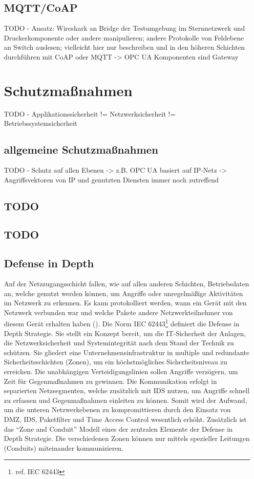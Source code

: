 \subsection{\ac{MQTT}/\ac{CoAP}}
TODO - Ansatz: Wireshark an Bridge der Testumgebung im Sternnetzwerk und Druckerkomponente oder andere manipulieren; andere Protokolle von Feldebene an Switch auslesen; vielleicht hier nur beschreiben und in den höheren Schichten durchführen mit CoAP oder MQTT -> OPC UA Komponenten sind Gateway

\section{Schutzmaßnahmen}
TODO - Applikationssicherheit != Netzwerksicherheit != Betriebssystemsicherheit

\subsection{allgemeine Schutzmaßnahmen}
TODO - Schutz auf allen Ebenen -> z.B. OPC UA basiert auf IP-Netz -> Angriffsvektoren von IP und genutzten Diensten immer noch zutreffend

\subsection{TODO}
\subsection{TODO}

\subsection{Defense in Depth}
Auf der Netzzugangsschicht fallen, wie auf allen anderen Schichten, Betriebsdaten an, welche genutzt werden können, um Angriffe oder unregelmäßige Aktivitäten im Netzwerk zu erkennen. Es kann protokolliert werden, wann ein Gerät mit den Netzwerk verbunden war und welche Pakete andere Netzwerkteilnehmer von diesem Gerät erhalten haben (\cite{sichKom2017}). Die Norm IEC 62443\footnote{ref. IEC 62443} definiert die Defense in Depth Strategie. Sie stellt ein Konzept bereit, um die IT-Sicherheit der Anlagen, die Netzwerksicherheit und Systemintegrität nach dem Stand der Technik zu schützen. Sie gliedert eine Unternehmensinfrastruktur in multiple und redundante Sicherheitsschichten (Zonen), um ein höchstmögliches Sicherheitsniveau zu erreichen. Die unabhängigen Verteidigungslinien sollen Angriffe verzögern, um Zeit für Gegenmaßnahmen zu gewinnen. Die Kommunikation erfolgt in separierten Netzsegmenten, welche zusätzlich mit \ac{IDS} nutzen, um Angriffe schnell zu erfassen und Gegenmaßnahmen einleiten zu können. Somit wird der Aufwand, um die unteren Netzwerkebenen zu kompromittieren durch den Einsatz von \ac{DMZ}, \ac{IDS}, Paketfilter und Time Access Control wesentlich erhöht. Zusätzlich ist das "`Zone and Conduit"' Modell eines der zentralen Elemente der Defense in Depth Strategie. Die verschiedenen Zonen können nur mittels spezieller Leitungen (Conduits) miteinander kommunizieren.  


